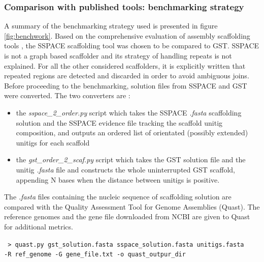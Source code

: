\documentclass[12pt]{article}
\begin{document}
\subsubsection{Comparison with published tools: benchmarking strategy}
A summary of the benchmarking strategy used is presented in figure \ref{fig:benchwork}. Based on the comprehensive evaluation of assembly scaffolding tools \cite{hunt_comprehensive_2014}, the SSPACE scaffolding tool was chosen to be compared to GST. SSPACE is not a graph based scaffolder and its strategy of handling repeats is not explained. For all the other considered scaffolders, it is explicitly written that repeated regions are detected and discarded in order to avoid ambiguous joins. Before proceeding to the benchmarking, solution files from SSPACE and GST were converted. The two converters are :
\begin{itemize}
\item the \textit{sspace\_2\_order.py} script which takes the SSPACE \textit{.fasta} scaffolding solution and the SSPACE evidence file tracking the scaffold unitig composition, and outputs an ordered list of orientated (possibly extended) unitigs for each scaffold
\item the \textit{gst\_order\_2\_scaf.py} script which takes the GST solution file and the unitig \textit{.fasta} file and constructs the whole uninterrupted GST scaffold, appending N bases when the distance between unitigs is positive.
\end{itemize}

The \textit{.fasta} files containing the nucleic sequence of scaffolding solution are compared with the Quality Assessment Tool for Genome Assemblies (Quast\cite{gurevich_quast:_2013}). The reference genomes and the gene file downloaded from NCBI are given to Quast for additional metrics.

\texttt{ > quast.py gst\_solution.fasta sspace\_solution.fasta unitigs.fasta \\ -R ref\_genome -G gene\_file.txt -o quast\_outpur\_dir}
\end{document}
